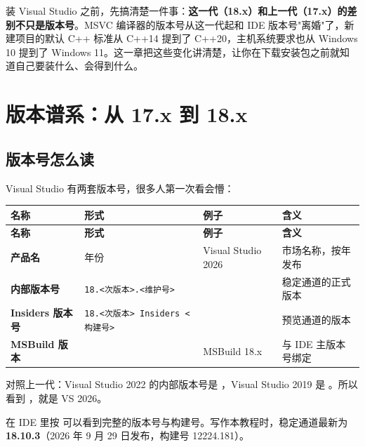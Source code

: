 装 Visual Studio 之前，先搞清楚一件事：\textbf{这一代（18.x）和上一代（17.x）的差别不只是版本号}。MSVC 编译器的版本号从这一代起和 IDE 版本号"离婚"了，新建项目的默认 C++ 标准从 C++14 提到了 C++20，主机系统要求也从 Windows 10 提到了 Windows 11。这一章把这些变化讲清楚，让你在下载安装包之前就知道自己要装什么、会得到什么。

\section{版本谱系：从 17.x 到 18.x}
\subsection{版本号怎么读}
Visual Studio 有两套版本号，很多人第一次看会懵：

\begin{longtable}{L{2.4cm}L{5.0cm}L{2.8cm}L{4.0cm}}
\toprule
\textbf{名称} & \textbf{形式} & \textbf{例子} & \textbf{含义} \\
\midrule
\endfirsthead
\toprule
\textbf{名称} & \textbf{形式} & \textbf{例子} & \textbf{含义} \\
\midrule
\endhead
\bottomrule
\endlastfoot
\textbf{产品名} & 年份 & Visual Studio 2026 & 市场名称，按年发布 \\
\textbf{内部版本号} & \texttt{18.<次版本>.<维护号>} &  & 稳定通道的正式版本 \\
\textbf{Insiders 版本号} & \texttt{18.<次版本> Insiders <构建号>} &  & 预览通道的版本 \\
\textbf{MSBuild 版本} &  & MSBuild 18.x & 与 IDE 主版本号绑定 \\
\end{longtable}

对照上一代：Visual Studio 2022 的内部版本号是 ，Visual Studio 2019 是 。所以看到 ，就是 VS 2026。

\begin{tipbox}[提示]
在 IDE 里按  可以看到完整的版本号与构建号。写作本教程时，稳定通道最新为 \textbf{18.10.3}（2026 年 9 月 29 日发布，构建号 12224.181）。
\end{tipbox}

